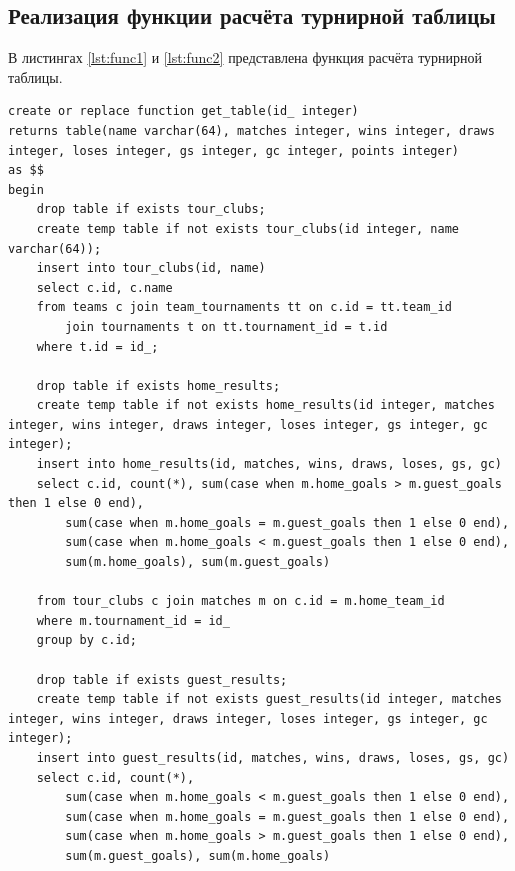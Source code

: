 \subsection{Реализация функции расчёта турнирной таблицы}
В листингах \ref{lst:func1} и \ref{lst:func2} представлена функция расчёта турнирной таблицы.
\newpage
\begin{lstlisting}[label=lst:func1,caption={Функция расчёта турнирной таблицы (часть 1)}]
create or replace function get_table(id_ integer)
returns table(name varchar(64), matches integer, wins integer, draws integer, loses integer, gs integer, gc integer, points integer)
as $$
begin
	drop table if exists tour_clubs;
	create temp table if not exists tour_clubs(id integer, name varchar(64));
    insert into tour_clubs(id, name)
	select c.id, c.name
	from teams c join team_tournaments tt on c.id = tt.team_id
		join tournaments t on tt.tournament_id = t.id
	where t.id = id_;

	drop table if exists home_results;
	create temp table if not exists home_results(id integer, matches integer, wins integer, draws integer, loses integer, gs integer, gc integer);
	insert into home_results(id, matches, wins, draws, loses, gs, gc)
	select c.id, count(*), sum(case when m.home_goals > m.guest_goals then 1 else 0 end),
		sum(case when m.home_goals = m.guest_goals then 1 else 0 end),
		sum(case when m.home_goals < m.guest_goals then 1 else 0 end),
		sum(m.home_goals), sum(m.guest_goals)

	from tour_clubs c join matches m on c.id = m.home_team_id
	where m.tournament_id = id_
	group by c.id;

	drop table if exists guest_results;
    create temp table if not exists guest_results(id integer, matches integer, wins integer, draws integer, loses integer, gs integer, gc integer);
	insert into guest_results(id, matches, wins, draws, loses, gs, gc)
	select c.id, count(*), 
		sum(case when m.home_goals < m.guest_goals then 1 else 0 end),
		sum(case when m.home_goals = m.guest_goals then 1 else 0 end),
		sum(case when m.home_goals > m.guest_goals then 1 else 0 end),
		sum(m.guest_goals), sum(m.home_goals)
\end{lstlisting}
